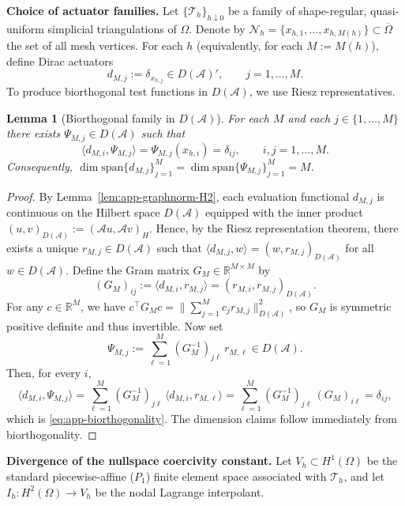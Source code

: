 \documentclass[11pt,a4paper]{article}
\numberwithin{equation}{section}
\newtheorem{lemma}[theorem]{Lemma}
\theoremstyle{definition}
\newcommand{\R}{\mathbb{R}}
\newcommand{\1}{\mathbbm{1}}
\begin{document}
\medskip
\noindent\textbf{Choice of actuator families.}
Let $\{\mathcal T_h\}_{h\downarrow 0}$ be a family of shape-regular, quasi-uniform simplicial triangulations of $\Omega$.
Denote by $\mathcal N_h=\{x_{h,1},\dots,x_{h,M(h)}\}\subset\overline\Omega$ the set of all mesh vertices.
For each $h$ (equivalently, for each $M:=M(h)$), define Dirac actuators
\begin{equation}
\label{eq:app-actuators-dirac}
d_{M,j}:=\delta_{x_{h,j}}\in D(\mathcal A)',\qquad j=1,\dots,M.
\end{equation}
To produce biorthogonal test functions in $D(\mathcal A)$, we use Riesz representatives.

\begin{lemma}[Biorthogonal family in $D(\mathcal A)$]
\label{lem:app-biorthogonal}
For each $M$ and each $j\in\{1,\dots,M\}$ there exists $\Psi_{M,j}\in D(\mathcal A)$ such that
\begin{equation}
\label{eq:app-biorthogonality}
\langle d_{M,i},\Psi_{M,j}\rangle = \Psi_{M,j}(x_{h,i}) = \delta_{ij},\qquad i,j=1,\dots,M.
\end{equation}
Consequently, $\dim\mathrm{span}\{d_{M,j}\}_{j=1}^M=\dim\mathrm{span}\{\Psi_{M,j}\}_{j=1}^M=M$.
\end{lemma}

\begin{proof}
By Lemma~\ref{lem:app-graphnorm-H2}, each evaluation functional $d_{M,j}$ is continuous on the Hilbert space
$D(\mathcal A)$ equipped with the inner product $(u,v)_{D(\mathcal A)}:=(\mathcal A u,\mathcal A v)_H$.
Hence, by the Riesz representation theorem, there exists a unique $r_{M,j}\in D(\mathcal A)$ such that
$\langle d_{M,j},w\rangle=(w,r_{M,j})_{D(\mathcal A)}$ for all $w\in D(\mathcal A)$.
Define the Gram matrix $G_M\in\R^{M\times M}$ by
\[
(G_M)_{ij}:=\langle d_{M,i},r_{M,j}\rangle = (r_{M,i},r_{M,j})_{D(\mathcal A)}.
\]
For any $c\in\R^M$, we have $c^\top G_M c=\big\|\sum_{j=1}^M c_j r_{M,j}\big\|_{D(\mathcal A)}^2$, so $G_M$ is symmetric
positive definite and thus invertible. Now set
\[
\Psi_{M,j} := \sum_{\ell=1}^M (G_M^{-1})_{j\ell}\, r_{M,\ell}\in D(\mathcal A).
\]
Then, for every $i$,
\[
\langle d_{M,i},\Psi_{M,j}\rangle
=\sum_{\ell=1}^M (G_M^{-1})_{j\ell}\,\langle d_{M,i},r_{M,\ell}\rangle
=\sum_{\ell=1}^M (G_M^{-1})_{j\ell}\,(G_M)_{i\ell} = \delta_{ij},
\]
which is \eqref{eq:app-biorthogonality}. The dimension claims follow immediately from biorthogonality.
\end{proof}

\medskip
\noindent\textbf{Divergence of the nullspace coercivity constant.}
Let $V_h\subset H^1(\Omega)$ be the standard piecewise-affine ($P_1$) finite element space associated with $\mathcal T_h$,
and let $I_h:H^2(\Omega)\to V_h$ be the nodal Lagrange interpolant.
\end{document}
